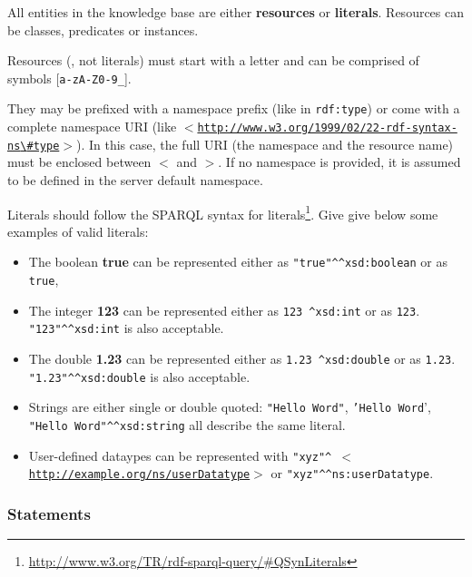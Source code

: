 All entities in the knowledge base are either \textbf{resources} or
\textbf{literals}. Resources can be classes, predicates or instances.

Resources (\ie, not literals) must start with a letter and can be comprised of
symbols [{\tt a-zA-Z0-9\_}].

They may be prefixed with a namespace prefix (like in \texttt{rdf:type}) or
come with a complete namespace URI (like
\texttt{$<$\href{http://www.w3.org/1999/02/22-rdf-syntax-ns\#type}{http://www.w3.org/1999/02/22-rdf-syntax-ns{\textbackslash}\#type}$>$}).
In this case, the full URI (the namespace and the resource name) must be
enclosed between $<$ and $>$. If no namespace is provided, it is assumed to be
defined in the server default namespace.

Literals should follow the SPARQL syntax for
literals\footnote{\url{http://www.w3.org/TR/rdf-sparql-query/\#QSynLiterals}}.
Give give below some examples of valid literals:

\begin{itemize}

    \item  The boolean {\bf true} can be represented either as
    \texttt{"true"\^{ }\^{ }xsd:boolean} or as \texttt{true},

    \item  The integer {\bf 123} can be represented either as \texttt{123\^{
    }\^{ }xsd:int} or as \texttt{123}. \texttt{"123"\^{ }\^{ }xsd:int} is also
    acceptable.

    \item  The double {\bf 1.23} can be represented either as \texttt{1.23\^{
    }\^{ }xsd:double} or as \texttt{1.23}. \texttt{"1.23"\^{ }\^{ }xsd:double}
    is also acceptable.

    \item  Strings are either single or double quoted: \texttt{"Hello Word"},
    \texttt{'Hello Word}', \texttt{"Hello Word"\^{ }\^{ }xsd:string} all
    describe the same literal.

    \item  User-defined dataypes can be represented with \texttt{"xyz"\^{ }\^{
    }$<$\href{http://example.org/ns/userDatatype}{http://example.org/ns/userDatatype}$>$}
    or \texttt{"xyz"\^{ }\^{ }ns:userDatatype}.

\end{itemize}

\subsubsection{Statements}


